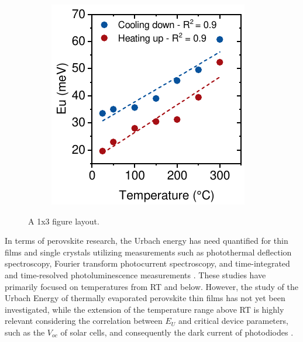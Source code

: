\begin{figure}[htbp]
\begin{subfigure}{0.32\textwidth}
        \caption{}
        \label{fig:ellipsometry:urbach_cooling}
    \end{subfigure}
    \hfill
    \begin{subfigure}{0.3\textwidth}
        \includegraphics[width=\textwidth]{chapters/ellipsometry/image/Urbach_temp.pdf}
        \caption{}
        \label{fig:ellipsometry:urbach_temp}
    \end{subfigure}
    \caption{A 1x3 figure layout.}
    \label{fig:ellipsometry:urbach}
\end{figure}

In terms of perovskite research, the Urbach energy has need quantified for thin films and single crystals utilizing measurements such as photothermal deflection spectroscopy, Fourier transform photocurrent spectroscopy, and time-integrated and time-resolved photoluminescence measurements \cite{Zhang2022UnravelingDisorder, Ledinsky2019TemperaturePerovskites, Singh2016EffectCHsub3/subNHsub3/subPbIsub3/sub, DeWolf2014OrganometallicPerformance, Falsini2022AnalysisPerovskites}. These studies have primarily focused on temperatures from RT and below. However, the study of the Urbach Energy of thermally evaporated perovskite thin films has not yet been investigated, while the extension of the temperature range above RT is highly relevant considering the correlation between $E_U$ and critical device parameters, such as the $V_{oc}$ of solar cells, and consequently the dark current of photodiodes \cite{Ledinsky2019TemperaturePerovskites}.

